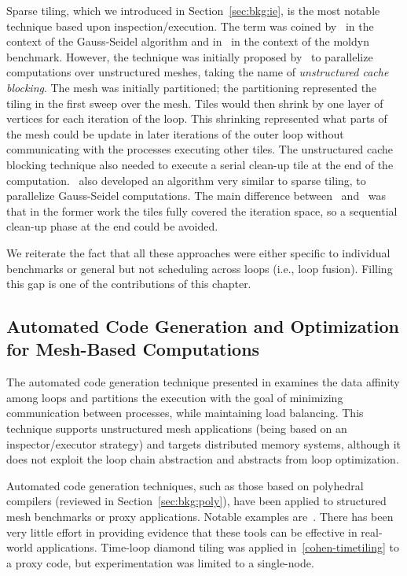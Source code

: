 Sparse tiling, which we introduced in Section~\ref{sec:bkg:ie}, is the most notable technique based upon inspection/execution. The term was coined by~\cite{ST-StroutLCPC2002,ST-StroutIJHPCA} in the context of the Gauss-Seidel algorithm and in~\cite{ST-StroutPLDI03} in the context of the moldyn benchmark. However, the technique was initially proposed by~\cite{ST-dimeEtna00} to parallelize computations over unstructured meshes, taking the name of \textit{unstructured cache blocking}. The mesh was initially partitioned; the partitioning represented the tiling in the first sweep over the mesh. Tiles would then shrink by one layer of vertices for each iteration of the loop. This shrinking represented what parts of the mesh could be update in later iterations of the outer loop without communicating with the processes executing other tiles. The unstructured cache blocking technique also needed to execute a serial clean-up tile at the end of the computation.~\cite{ST-Adams99c} also developed an algorithm very similar to sparse tiling, to parallelize Gauss-Seidel computations. The main difference between~\cite{ST-StroutLCPC2002,ST-StroutIJHPCA} and~\cite{ST-dimeEtna00} was that in the former work the tiles fully covered the iteration space, so a sequential clean-up phase at the end could be avoided. 

We reiterate the fact that all these approaches were either specific to individual benchmarks or general but not scheduling across loops (i.e., loop fusion). Filling this gap is one of the contributions of this chapter.

\subsection*{Automated Code Generation and Optimization for Mesh-Based Computations}
The automated code generation technique presented in \cite{ST-OhioStateMPICodeGen} examines the data affinity among loops and partitions the execution with the goal of minimizing communication between processes, while maintaining load balancing. This technique supports unstructured mesh applications (being based on an inspector/executor strategy) and targets distributed memory systems, although it does not exploit the loop chain abstraction and abstracts from loop optimization.

Automated code generation techniques, such as those based on polyhedral compilers (reviewed in Section~\ref{sec:bkg:poly}), have been applied to structured mesh benchmarks or proxy applications. Notable examples are~\cite{pluto,polly,loopy}. There has been very little effort in providing evidence that these tools can be effective in real-world applications. Time-loop diamond tiling was applied in~\ref{cohen-timetiling} to a proxy code, but experimentation was limited to a single-node.

